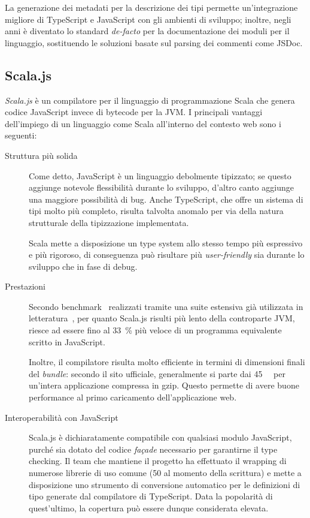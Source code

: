       La generazione dei metadati per la descrizione dei tipi permette un'integrazione migliore di TypeScript e JavaScript con gli ambienti di sviluppo;
      inoltre, negli anni è diventato lo standard \emph{de-facto} per la documentazione dei moduli per il linguaggio, sostituendo le soluzioni basate sul parsing dei commenti come JSDoc.

    \subsection{Scala.js}\label{subsec:scalajs}
      \emph{Scala.js} è un compilatore per il linguaggio di programmazione Scala che genera codice JavaScript invece di bytecode per la JVM\@.
      I principali vantaggi dell'impiego di un linguaggio come Scala all'interno del contesto web sono i seguenti:
      \begin{description}
        \item[Struttura più solida]
          Come detto, JavaScript è un linguaggio debolmente tipizzato;
          se questo aggiunge notevole flessibilità durante lo sviluppo, d'altro canto aggiunge una maggiore possibilità di bug.
          Anche TypeScript, che offre un sistema di tipi molto più completo, risulta talvolta anomalo per via della natura strutturale della tipizzazione implementata.

          Scala mette a disposizione un type system allo stesso tempo più espressivo e più rigoroso, di conseguenza può risultare più \emph{user-friendly} sia durante lo sviluppo che in fase di debug.

        \item[Prestazioni]
          Secondo benchmark~\cite{Doeraene:256862} realizzati tramite una suite estensiva già utilizzata in letteratura~\cite{10.1145/3093334.2989232}, per quanto Scala.js risulti più lento della controparte JVM, riesce ad essere fino al \SI{33}{\percent} più veloce di un programma equivalente scritto in JavaScript.

          Inoltre, il compilatore risulta molto efficiente in termini di dimensioni finali del \emph{bundle}:
          secondo il sito ufficiale, generalmente si parte dai \SI{45}{\kilo\byte} per un'intera applicazione compressa in gzip.
          Questo permette di avere buone performance al primo caricamento dell'applicazione web.

        \item[Interoperabilità con JavaScript]
          Scala.js è dichiaratamente compatibile con qualsiasi modulo JavaScript, purché sia dotato del codice \emph{façade} necessario per garantirne il type checking.
          Il team che mantiene il progetto ha effettuato il wrapping di numerose librerie di uso comune (50 al momento della scrittura) e mette a disposizione uno strumento di conversione automatico per le definizioni di tipo generate dal compilatore di TypeScript.
          Data la popolarità di quest'ultimo, la copertura può essere dunque considerata elevata.


\end{description}
